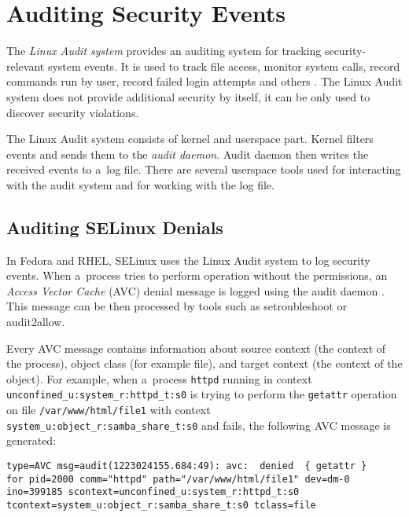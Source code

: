 \section{Auditing Security Events}

The \emph{Linux Audit system} provides an auditing system for tracking
security-relevant system events. It is used to track file access, monitor system
calls, record commands run by user, record failed login attempts and others
\cite{secguide}. The Linux Audit system does not provide additional security by
itself, it can be only used to discover security violations.

The Linux Audit system consists of kernel and userspace part. Kernel filters
events and sends them to the \emph{audit daemon}. Audit daemon then writes the
received events to a~log file. There are several userspace tools used for
interacting with the audit system and for working with the log file.

\subsection{Auditing SELinux Denials}

In Fedora and RHEL, SELinux uses the Linux Audit system to log security events.
When a~process tries to perform operation without the permissions, an
\emph{Access Vector Cache} (AVC) denial message is logged using the audit daemon
\cite{selinuxguide}. This message can be then processed by tools such as
setroubleshoot or audit2allow.

Every AVC message contains information about source context (the context of the
process), object class (for example file), and target context (the context of
the object). For example, when a~process \texttt{httpd} running in context
\texttt{unconfined\_u:system\_r:httpd\_t:s0} is trying to perform the
\texttt{getattr} operation on file \texttt{/var/www/html/file1} with context
\texttt{system\_u:object\_r:samba\_share\_t:s0} and fails, the following AVC
message is generated:

\begin{lstlisting}
type=AVC msg=audit(1223024155.684:49): avc:  denied  { getattr }
for pid=2000 comm="httpd" path="/var/www/html/file1" dev=dm-0
ino=399185 scontext=unconfined_u:system_r:httpd_t:s0
tcontext=system_u:object_r:samba_share_t:s0 tclass=file
\end{lstlisting}

